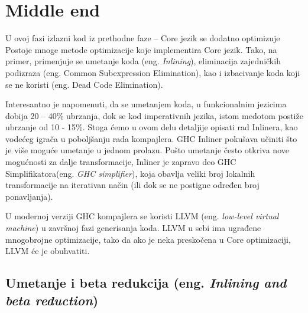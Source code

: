 \section{Middle end}
\label{sec:middle}

U ovoj fazi izlazni kod iz prethodne faze – Core jezik se dodatno optimizuje 
Postoje mnoge metode optimizacije koje implementira Core jezik. Tako, na primer, primenjuje se umetanje koda (eng. \emph{Inlining}), eliminacija zajedničkih podizraza (eng. Common Subexpression Elimination), kao i izbacivanje koda koji se ne koristi (eng. Dead Code Elimination).

Interesantno je napomenuti, da se umetanjem koda, u funkcionalnim jezicima dobija 20 – 40\% ubrzanja, dok se kod imperativnih jezika, istom medotom postiže ubrzanje od 10 - 15\%. Stoga ćemo u ovom delu detaljije opisati rad Inlinera, kao vodećeg igrača u poboljšanju rada kompajlera. GHC Inliner pokušava učiniti  što je više moguće umetanje u jednom prolazu. Pošto umetanje često otkriva nove mogućnosti za dalje transformacije, Inliner je zapravo deo GHC Simplifikatora(eng. \emph{GHC simplifier}), koja obavlja veliki broj lokalnih transformacije na iterativan način (ili dok se ne postigne određen broj ponavljanja).

U modernoj verziji GHC kompajlera se koristi LLVM (eng. \emph{low-level virtual machine}) u završnoj fazi generisanja koda. LLVM u sebi ima ugrađene mnogobrojne optimizacije, tako da ako je neka preskočena u Core optimizaciji, LLVM će je obuhvatiti.

\subsection{Umetanje i beta redukcija (eng. \emph{Inlining and beta reduction})}
\label{subsec:podnaslovInlineBeta}

